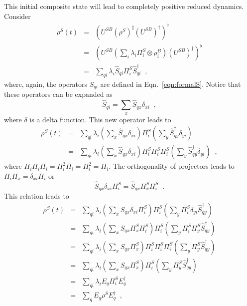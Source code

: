 This initial composite state will lead to completely positive reduced dynamics.  Consider
\begin{eqnarray*}
\rho^S(t) &=& \left(U^{SB}(\rho^{S})^\sharp\left(U^{SB}\right)^\dagger\right)^\flat\\
&=& \left(U^{SB}\left( \sum_i \lambda_i \Pi^S_i \otimes \rho^B_i \right)\left(U^{SB}\right)^\dagger\right)^\flat\\
&=& \sum_{qi} \lambda_i \hat{S}_{qi} \Pi^S_i \hat{S}^\dagger_{qi}\;\;,
\end{eqnarray*}
where, again, the operators $\hat{S}_{qi}$ are defined in Eqn.\ \ref{eqn:formalS}.  Notice that these operators can be expanded as
\begin{equation*}
\hat{S}_{qi} = \sum_x \hat{S}_{qx} \delta_{xi}\;\;,
\end{equation*}
where $\delta$ is a delta function.  This new operator leads to
\begin{eqnarray*}
\rho^S(t)&=& \sum_{qi} \lambda_i \left( \sum_x \hat{S}_{qx} \delta_{xi}\right) \Pi^S_i \left( \sum_y \hat{S}^\dagger_{qy} \delta_{yi}\right)\\
&=& \sum_{qi} \lambda_i \left( \sum_x \hat{S}_{qx} \delta_{xi}\right) \Pi^S_i \Pi^S_i \Pi^S_i  \left( \sum_y \hat{S}^\dagger_{qy} \delta_{yi}\right)\;\;,
\end{eqnarray*}
where $\Pi_i\Pi_i\Pi_i=\Pi_i^2\Pi_i=\Pi_i^2=\Pi_i$.  The orthogonality of projectors leads to $\Pi_i\Pi_x = \delta_{xi}\Pi_i$ or
\begin{equation*}
\hat{S}_{qx} \delta_{xi} \Pi_i^S = \hat{S}_{qx} \Pi^S_x \Pi^S_i \;\;.
\end{equation*}
This relation leads to
\begin{eqnarray*}
\rho^S(t) &=& \sum_{qi} \lambda_i \left( \sum_x \hat{S}_{qx} \delta_{xi} \Pi^S_i\right) \Pi^S_i \left( \sum_y \Pi^S_i \delta_{yi} \hat{S}^\dagger_{qy} \right)\\
&=& \sum_{qi} \lambda_i \left( \sum_x \hat{S}_{qx} \Pi^S_x \Pi^S_i\right) \Pi^S_i \left( \sum_y \Pi^S_i \Pi^S_y \hat{S}^\dagger_{qy} \right)\\
&=& \sum_{qi} \lambda_i \left( \sum_x \hat{S}_{qx} \Pi^S_x \right)\Pi^S_i \Pi^S_i \Pi^S_i \left( \sum_y \Pi^S_y \hat{S}^\dagger_{qy} \right)\\
&=& \sum_{qi} \lambda_i \left( \sum_x \hat{S}_{qx} \Pi^S_x \right)\Pi^S_i\left( \sum_y \Pi^S_y \hat{S}^\dagger_{qy} \right)\\
&=& \sum_{qi} \lambda_i E_q \Pi^S_i E^\dagger_q\\
&=& \sum_q E_q \rho^S E_q^\dagger\;\;,
\end{eqnarray*}
